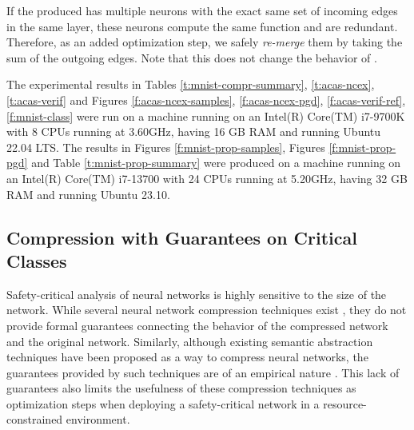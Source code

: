 If the \abs produced has multiple neurons with the exact same set of incoming
edges in the same layer, these neurons compute the same function and are
redundant. Therefore, as an added optimization step, we safely \textit{re-merge}
them by taking the sum of the outgoing edges. Note that this does not change the
behavior of \abs.

The experimental results in Tables
\ref{t:mnist-compr-summary}, 
\ref{t:acas-ncex}, \ref{t:acas-verif} and Figures \ref{f:acas-ncex-samples},
\ref{f:acas-ncex-pgd}, \ref{f:acas-verif-ref},
\ref{f:mnist-class} were
run on a machine running on an Intel(R) Core(TM) i7-9700K with 8 CPUs running at
3.60GHz, having 16 GB RAM and running Ubuntu 22.04 LTS. The results in
Figures \ref{f:mnist-prop-samples}, Figures \ref{f:mnist-prop-pgd} and Table
\ref{t:mnist-prop-summary} were produced on a 
machine running on an Intel(R) Core(TM) i7-13700 with 24 CPUs running at
5.20GHz, having 32 GB RAM and running Ubuntu 23.10.

\subsection{Compression with Guarantees on Critical Classes}
\label{s:exp-mnist-comp}

Safety-critical analysis of neural networks is highly sensitive to the size of
the network. While several neural network compression techniques exist 
\cite{dnn-compression}, they do not provide formal guarantees 
connecting the behavior of the compressed network and the original network.
Similarly, although existing semantic abstraction techniques have been proposed
as a way to compress neural networks, the guarantees provided by such 
techniques are of an empirical nature \cite{lin-comb-abs-jan}.
This lack of guarantees also limits the usefulness of these compression
techniques as optimization steps when deploying a safety-critical network in a
resource-constrained environment. 

